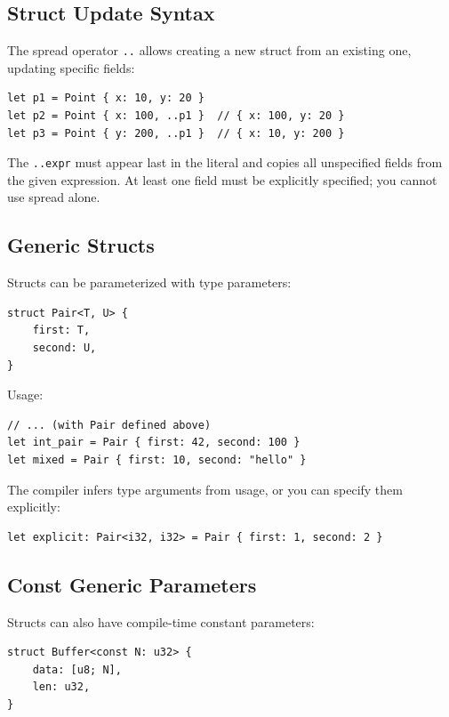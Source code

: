 \subsection{Struct Update Syntax}

The spread operator \texttt{..} allows creating a new struct from an existing one, updating specific fields:

\begin{lstlisting}
let p1 = Point { x: 10, y: 20 }
let p2 = Point { x: 100, ..p1 }  // { x: 100, y: 20 }
let p3 = Point { y: 200, ..p1 }  // { x: 10, y: 200 }
\end{lstlisting}

The \texttt{..expr} must appear last in the literal and copies all unspecified fields from the given expression. At least one field must be explicitly specified; you cannot use spread alone.

\subsection{Generic Structs}

Structs can be parameterized with type parameters:

\begin{lstlisting}
struct Pair<T, U> {
    first: T,
    second: U,
}
\end{lstlisting}

Usage:

\begin{lstlisting}
// ... (with Pair defined above)
let int_pair = Pair { first: 42, second: 100 }
let mixed = Pair { first: 10, second: "hello" }
\end{lstlisting}

The compiler infers type arguments from usage, or you can specify them explicitly:

\begin{lstlisting}
let explicit: Pair<i32, i32> = Pair { first: 1, second: 2 }
\end{lstlisting}

\subsection{Const Generic Parameters}

Structs can also have compile-time constant parameters:

\begin{lstlisting}
struct Buffer<const N: u32> {
    data: [u8; N],
    len: u32,
}
\end{lstlisting}

